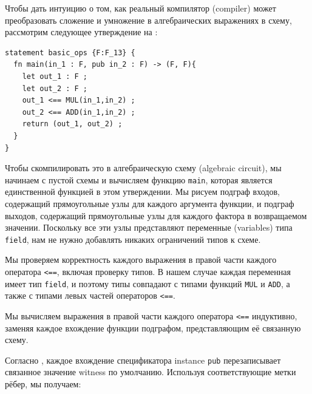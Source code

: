 \begin{example} Чтобы дать интуицию о том, как реальный компилятор (compiler) может преобразовать сложение и умножение в алгебраических выражениях в схему, рассмотрим следующее утверждение на :
\begin{lstlisting}
statement basic_ops {F:F_13} {
  fn main(in_1 : F, pub in_2 : F) -> (F, F){
  	let out_1 : F ;
	let out_2 : F ;
    out_1 <== MUL(in_1,in_2) ;
    out_2 <== ADD(in_1,in_2) ;
    return (out_1, out_2) ;
  }
}
\end{lstlisting} 
Чтобы скомпилировать это в алгебраическую схему (algebraic circuit), мы начинаем с пустой схемы и вычисляем функцию \texttt{main}, которая является единственной функцией в этом утверждении. Мы рисуем подграф входов, содержащий прямоугольные узлы для каждого аргумента функции, и подграф выходов, содержащий прямоугольные узлы для каждого фактора в возвращаемом значении. Поскольку все эти узлы представляют переменные (variables) типа \texttt{field}, нам не нужно добавлять никаких ограничений типов к схеме.

Мы проверяем корректность каждого выражения в правой части каждого оператора \texttt{<==}, включая проверку типов. В нашем случае каждая переменная имеет тип \texttt{field}, и поэтому типы совпадают с типами функций \texttt{MUL} и \texttt{ADD}, а также с типами левых частей операторов \texttt{<==}.

Мы вычисляем выражения в правой части каждого оператора \texttt{<==} индуктивно, заменяя каждое вхождение функции подграфом, представляющим её связанную схему.

Согласно , каждое вхождение спецификатора instance \texttt{pub} перезаписывает связанное значение witness по умолчанию. Используя соответствующие метки рёбер, мы получаем:
\begin{center}
\end{center}
\end{example}
